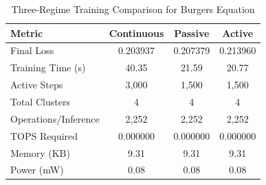 \begin{table}[htbp]
\centering
\caption{Three-Regime Training Comparison for Burgers Equation}
\label{tab:three_regime_comparison}
\begin{tabular}{l|ccc}
\hline
\textbf{Metric} & \textbf{Continuous} & \textbf{Passive} & \textbf{Active} \\
\hline
Final Loss & 0.203937 & 0.207379 & 0.213960 \\
Training Time (s) & 40.35 & 21.59 & 20.77 \\
Active Steps & 3,000 & 1,500 & 1,500 \\
Total Clusters & 4 & 4 & 4 \\
Operations/Inference & 2,252 & 2,252 & 2,252 \\
TOPS Required & 0.000000 & 0.000000 & 0.000000 \\
Memory (KB) & 9.31 & 9.31 & 9.31 \\
Power (mW) & 0.08 & 0.08 & 0.08 \\
\hline
\end{tabular}
\end{table}
